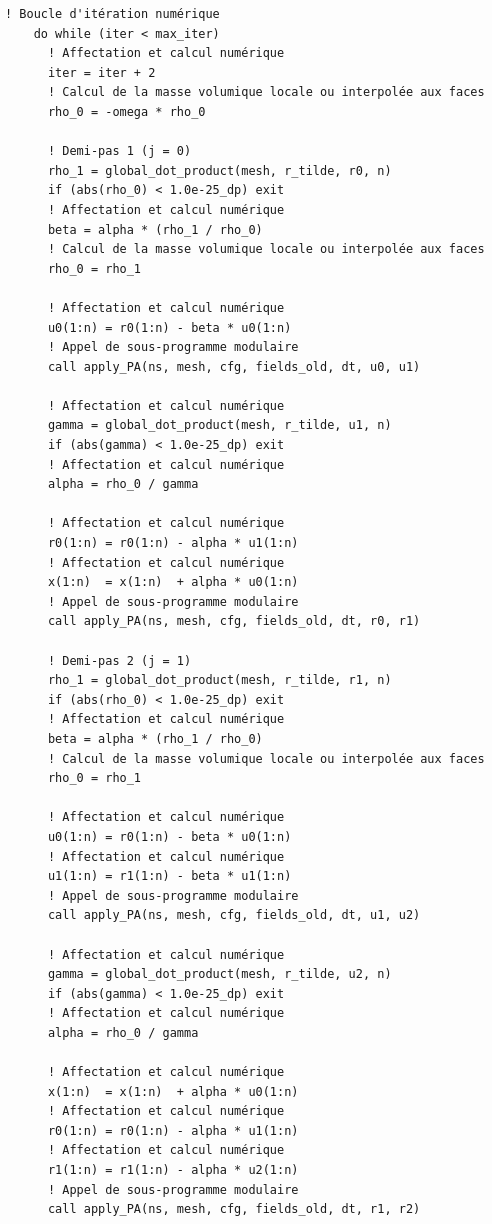 \documentclass[10pt,a4paper,oneside]{book}
\begin{document}
\begin{lstlisting}[language={[95]Fortran}]
    ! Boucle d'itération numérique
    do while (iter < max_iter)
      ! Affectation et calcul numérique
      iter = iter + 2
      ! Calcul de la masse volumique locale ou interpolée aux faces
      rho_0 = -omega * rho_0

      ! Demi-pas 1 (j = 0)
      rho_1 = global_dot_product(mesh, r_tilde, r0, n)
      if (abs(rho_0) < 1.0e-25_dp) exit
      ! Affectation et calcul numérique
      beta = alpha * (rho_1 / rho_0)
      ! Calcul de la masse volumique locale ou interpolée aux faces
      rho_0 = rho_1

      ! Affectation et calcul numérique
      u0(1:n) = r0(1:n) - beta * u0(1:n)
      ! Appel de sous-programme modulaire
      call apply_PA(ns, mesh, cfg, fields_old, dt, u0, u1)

      ! Affectation et calcul numérique
      gamma = global_dot_product(mesh, r_tilde, u1, n)
      if (abs(gamma) < 1.0e-25_dp) exit
      ! Affectation et calcul numérique
      alpha = rho_0 / gamma

      ! Affectation et calcul numérique
      r0(1:n) = r0(1:n) - alpha * u1(1:n)
      ! Affectation et calcul numérique
      x(1:n)  = x(1:n)  + alpha * u0(1:n)
      ! Appel de sous-programme modulaire
      call apply_PA(ns, mesh, cfg, fields_old, dt, r0, r1)

      ! Demi-pas 2 (j = 1)
      rho_1 = global_dot_product(mesh, r_tilde, r1, n)
      if (abs(rho_0) < 1.0e-25_dp) exit
      ! Affectation et calcul numérique
      beta = alpha * (rho_1 / rho_0)
      ! Calcul de la masse volumique locale ou interpolée aux faces
      rho_0 = rho_1

      ! Affectation et calcul numérique
      u0(1:n) = r0(1:n) - beta * u0(1:n)
      ! Affectation et calcul numérique
      u1(1:n) = r1(1:n) - beta * u1(1:n)
      ! Appel de sous-programme modulaire
      call apply_PA(ns, mesh, cfg, fields_old, dt, u1, u2)

      ! Affectation et calcul numérique
      gamma = global_dot_product(mesh, r_tilde, u2, n)
      if (abs(gamma) < 1.0e-25_dp) exit
      ! Affectation et calcul numérique
      alpha = rho_0 / gamma

      ! Affectation et calcul numérique
      x(1:n)  = x(1:n)  + alpha * u0(1:n)
      ! Affectation et calcul numérique
      r0(1:n) = r0(1:n) - alpha * u1(1:n)
      ! Affectation et calcul numérique
      r1(1:n) = r1(1:n) - alpha * u2(1:n)
      ! Appel de sous-programme modulaire
      call apply_PA(ns, mesh, cfg, fields_old, dt, r1, r2)


\end{lstlisting}
\end{document}
